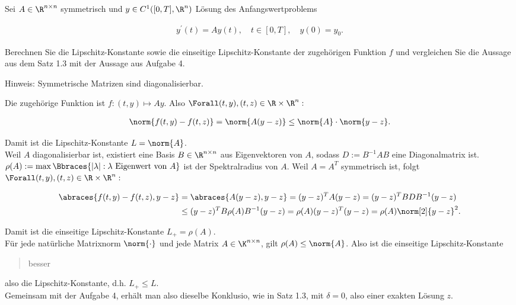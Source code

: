 \begin{exercise}

Sei $A \in \R^{n \times n}$ symmetrisch und $y \in C^1([0, T], \R^n)$ Lösung des Anfangswertproblems

\begin{align*}
  y^\prime(t) = A y(t),
  \quad
  t \in [0, T],
  \quad
  y(0) = y_0.
\end{align*}

Berechnen Sie die Lipschitz-Konstante sowie die einseitige Lipschitz-Konstante der zugehörigen Funktion $f$ und vergleichen Sie die Aussage aus dem Satz 1.3 mit der Aussage aus Aufgabe 4.

Hinweis: Symmetrische Matrizen sind diagonalisierbar.

\end{exercise}

\begin{solution}

Die zugehörige Funktion ist $f: (t, y) \mapsto Ay$.
Also $\Forall (t, y), (t, z) \in \R \times \R^n:$

\begin{align*}
  \norm{f(t, y) - f(t, z)}
  =
  \norm{A (y - z)}
  \leq
  \norm{A} \cdot \norm{y - z}.
\end{align*}

Damit ist die Lipschitz-Konstante $L = \norm{A}$. \\

Weil $A$ diagonalisierbar ist, existiert eine Basis $B \in \R^{n \times n}$ aus Eigenvektoren von $A$, sodass $D := B^{-1} A B$ eine Diagonalmatrix ist.
$\rho(A) := \max \Bbraces{|\lambda|: \lambda \text{ Eigenwert von } A}$ ist der Spektralradius von $A$.
Weil $A = A^T$ symmetrisch ist, folgt $\Forall (t, y), (t, z) \in \R \times \R^n:$

\begin{align*}
  \abraces{f(t, y) - f(t, z), y - z}
  & =
  \abraces{A (y - z), y - z}
  =
  (y - z)^T A (y - z)
  =
  (y - z)^T B D B^{-1} (y - z) \\
  & \leq
  (y - z)^T B \rho(A) B^{-1} (y - z)
  =
  \rho(A) (y - z)^T (y - z)
  =
  \rho(A) \norm[2]{y - z}^2.
\end{align*}

Damit ist die einseitige Lipschitz-Konstante $L_+ = \rho(A)$. \\

Für jede natürliche Matrixnorm $\norm{\cdot}$ und jede Matrix $A \in \K^{n \times n}$, gilt $\rho(A) \leq \norm{A}$. Also ist die einseitige Lipschitz-Konstante \blockquote{besser} also die Lipschitz-Konstante, d.h. $L_+ \leq L$. \\

Gemeinsam mit der Aufgabe 4, erhält man also dieselbe Konklusio, wie in Satz 1.3, mit $\delta = 0$, also einer exakten Lösung $z$.

\end{solution}
